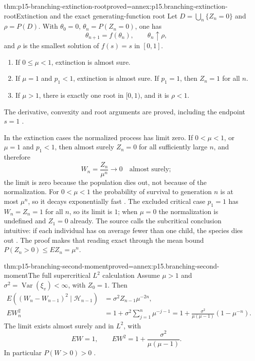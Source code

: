 \begin{hbtheorem}{thm:p15-branching-extinction-root}{proved=annex:p15.branching-extinction-root}{Extinction and the exact generating-function root}
Let \(D=\bigcup_n\{Z_n=0\}\) and \(\rho=P(D)\).
With \(\theta_0=0\), \(\theta_n=P(Z_n=0)\), one has
\[
                 \theta_{n+1}=f(\theta_n),\qquad
                 \theta_n\uparrow\rho,
\]
and \(\rho\) is the smallest solution of \(f(s)=s\) in \([0,1]\).
\begin{enumerate}
\item If \(0\leq\mu<1\), extinction is almost sure.
\item If \(\mu=1\) and \(p_1<1\), extinction is almost sure.
      If \(p_1=1\), then \(Z_n=1\) for all \(n\).
\item If \(\mu>1\), there is exactly one root in \([0,1)\),
      and it is \(\rho<1\).
\end{enumerate}
The derivative, convexity and root arguments are proved, including
the endpoint \(s=1\)
\cite[thms.~4.3.10--12]{DurrettPTEAuthor2019}.

In the extinction cases the normalized process has limit zero.
If \(0<\mu<1\), or \(\mu=1\) and \(p_1<1\), then almost surely
\(Z_n=0\) for all sufficiently large \(n\), and therefore
\[
                 W_n=\frac{Z_n}{\mu^n}\longrightarrow0
                 \quad\text{almost surely};
\]
the limit is zero because the population dies out, not because of
the normalization. For \(0<\mu<1\) the probability of survival to
generation \(n\) is at most \(\mu^n\), so it decays exponentially fast
\cite[thm.~4.3.10, p.~231; p.~232]{DurrettPTEAuthor2019}.
The excluded critical case \(p_1=1\) has \(W_n=Z_n=1\) for all \(n\),
so its limit is \(1\); when \(\mu=0\) the normalization is undefined and
\(Z_1=0\) already. The source calls the subcritical conclusion intuitive:
if each individual has on average fewer than one child, the species
dies out \cite[p.~231]{DurrettPTEAuthor2019}. The proof makes that
reading exact through the mean bound \(P(Z_n>0)\leq EZ_n=\mu^n\).
\end{hbtheorem}

\begin{hbtheorem}{thm:p15-branching-second-moment}{proved=annex:p15.branching-second-moment}{The full supercritical \(L^2\) calculation}
Assume \(\mu>1\) and
\(\sigma^2=\operatorname{Var}(\xi_v)<\infty\), with \(Z_0=1\).
Then
\[
 \begin{split}
 E((W_n-W_{n-1})^2\mid\mathcal H_{n-1})
                         &=\sigma^2Z_{n-1}\mu^{-2n},\\
 EW_n^2&=1+\sigma^2\sum_{j=1}^n\mu^{-j-1}
        =1+\frac{\sigma^2}{\mu(\mu-1)}(1-\mu^{-n}).
 \end{split}
\]
The limit exists almost surely and in \(L^2\), with
\[
                    EW=1,\qquad
                    EW^2=1+\frac{\sigma^2}{\mu(\mu-1)}.
\]
In particular \(P(W>0)>0\)
\cite[example~4.4.9, p.~238]{DurrettPTEAuthor2019}.
\end{hbtheorem}

